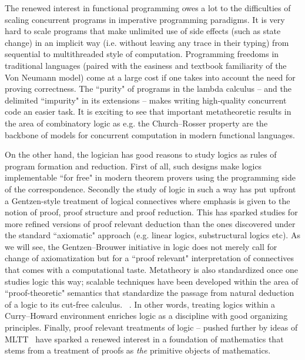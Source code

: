 The renewed interest in functional programming owes a lot to the
 difficulties of scaling concurrent programs in imperative programming paradigms. 
 It is very hard  to scale programs that make unlimited use of side effects 
 (such as state change) in an implicit way (i.e. without leaving any trace in their typing)
  from sequential to  multithreaded style of computation. Programming freedoms in traditional 
  languages (paired with the easiness and textbook familiarity of the Von Neumann model) come 
  at a large cost if one takes into account the need for proving 
  correctness. The ``purity" of
   programs in the lambda calculus -- and the delimited ``impurity" in its extensions -- makes 
   writing high-quality concurrent code an easier task. 
   It is exciting to see that important metatheoretic results in the area of combinatory logic as e.g. the Church--Rosser 
   property are the backbone of models for concurrent computation in modern functional languages. 



On the other hand, the logician has good reasons to study logics as rules of program formation and reduction. First of all, 
such designs make logics implementable ``for free"
in modern theorem provers using the programming side of the correspondence. 
Secondly the study of logic in such a way has put upfront a  Gentzen-style treatment of logical 
connectives where emphasis is given to the notion of proof, proof structure and proof reduction. 
This has sparked studies for more refined versions of proof relevant deduction than the ones 
discovered under the standard ``axiomatic" approach (e.g. linear logics, substructural logics etc). 
As we will see, the Gentzen--Brouwer initiative in  logic  does not merely call for change of 
axiomatization but for a ``proof relevant" interpretation of connectives that comes with a
computational taste. Metatheory is also standardized once one studies logic this way;  
scalable techniques have been developed within the area of ``proof-theoretic" semantics 
that standardize the passage from  natural deduction of a logic to its cut-free calculus.
 ~\cite{Sieg1998,pfenning2000structural}. 
In other words, treating logics within a Curry--Howard environment 
enriches logic as a discipline with good organizing principles. 
Finally, proof relevant treatments of logic -- pushed further by ideas of 
\ac{MLTT}~\cite{martin1984intuitionistic} 
have sparked  a renewed interest in  a foundation of mathematics that stems from 
a  treatment of proofs as \textit{the} primitive objects of mathematics. 


